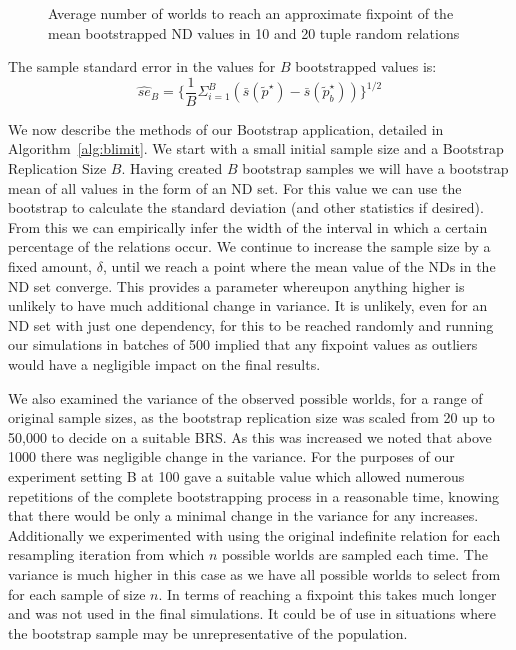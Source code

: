\begin{figure}
\centerline{}
\caption{\label{graph:linboot}\scriptsize{Average number of worlds to
reach an approximate fixpoint of the mean bootstrapped ND values in 10
and 20 tuple random relations}}
\end{figure}


\begin{definition}
\begin{rm}
The sample \linebreak[4] standard error in the values for $B$ bootstrapped
values is:
\begin{displaymath}
\hat{se}_B = \{ \frac{1}{B}\Sigma_{i = 1}^{B}(\bar{s}(\tilde{p}^\star) - \bar{s}(\tilde{p}^\star_b)) \}^{1/2}
\end{displaymath}
\end{rm}
\end{definition}

We now describe the methods of our Bootstrap application, detailed in
Algorithm~\ref{alg:blimit}.
We start with a small initial sample size and a 
Bootstrap Replication Size $B$. 
Having created $B$ bootstrap samples we will have a bootstrap
mean of all values in the form of an ND set. For this value
we can use the bootstrap to calculate the standard deviation
(and other statistics if desired). From this we can empirically infer the width of the interval
in which a certain percentage of the relations occur. We continue
to increase the sample size by a fixed amount, $\delta$, until we reach 
a point where
the mean value of the NDs in the ND set converge. This 
provides a parameter whereupon anything higher is unlikely to have 
much additional change in variance. It is unlikely, even for an ND set with
just one dependency, for this to be reached randomly and running
our simulations in batches of 500 implied that any fixpoint values as 
outliers would have a negligible impact on the final results.

\medskip

We also examined the variance of the
observed possible worlds, for a range of original sample sizes,
 as the bootstrap replication
size was scaled from 20 up to 50,000 to decide on a suitable BRS. 
As this was increased we noted that
above 1000 there was negligible change in the variance. For the purposes
of our experiment setting B at 100 gave a suitable value
which allowed numerous repetitions of the complete bootstrapping process
in a reasonable time, knowing that there would be only a minimal change
in the variance for any increases. Additionally we experimented with 
using the original indefinite 
relation for each resampling iteration from which $n$ possible worlds are
sampled each time. The variance is much higher in this case as we
have all possible worlds to select from for each sample of size $n$.
In terms of reaching a fixpoint this takes much longer and was not used
in the final simulations. It could be of use
in situations where the
bootstrap sample may be unrepresentative of the population.


